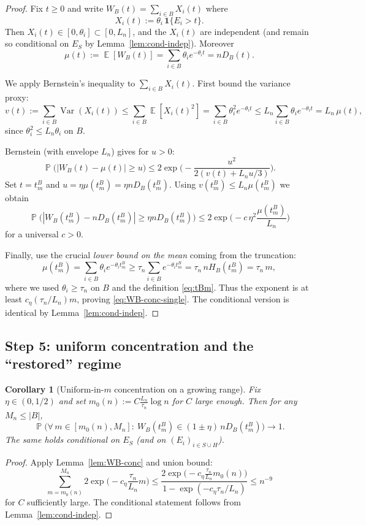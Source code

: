 \documentclass[11pt]{article}
\newtheorem{cor}{Corollary}
\DeclareMathOperator{\E}{\mathbb E}
\DeclareMathOperator{\Pp}{\mathbb P}
\DeclareMathOperator{\Var}{\mathrm{Var}}
\begin{document}
\begin{proof}
Fix $t\ge 0$ and write $W_B(t)=\sum_{i\in B}X_i(t)$ where
\[
X_i(t):=\theta_i\,\mathbf 1\{E_i>t\}.
\]
Then $X_i(t)\in[0,\theta_i]\subset[0,L_n]$, and the $X_i(t)$ are independent
(and remain so conditional on $E_S$ by Lemma~\ref{lem:cond-indep}).
Moreover
\[
\mu(t):=\E[W_B(t)] = \sum_{i\in B}\theta_i e^{-\theta_i t}=nD_B(t).
\]

We apply Bernstein's inequality to $\sum_{i\in B}X_i(t)$.
First bound the variance proxy:
\[
v(t):=\sum_{i\in B}\Var(X_i(t))
\le \sum_{i\in B}\E[X_i(t)^2]
=\sum_{i\in B}\theta_i^2 e^{-\theta_i t}
\le L_n\sum_{i\in B}\theta_i e^{-\theta_i t}
= L_n\,\mu(t),
\]
since $\theta_i^2\le L_n\theta_i$ on $B$.

Bernstein (with envelope $L_n$) gives for $u>0$:
\[
\Pp\big(|W_B(t)-\mu(t)|\ge u\big)
\le 2\exp\!\Big(-\frac{u^2}{2(v(t)+L_n u/3)}\Big).
\]
Set $t=t^B_m$ and $u=\eta\mu(t^B_m)=\eta nD_B(t^B_m)$. Using $v(t^B_m)\le L_n\mu(t^B_m)$ we obtain
\[
\Pp\Big(|W_B(t^B_m)-nD_B(t^B_m)|\ge \eta nD_B(t^B_m)\Big)
\le
2\exp\!\Big(-c\,\eta^2\frac{\mu(t^B_m)}{L_n}\Big)
\]
for a universal $c>0$.

Finally, use the crucial \emph{lower bound on the mean} coming from the truncation:
\[
\mu(t^B_m)=\sum_{i\in B}\theta_i e^{-\theta_i t^B_m}
\ge
\tau_n\sum_{i\in B} e^{-\theta_i t^B_m}
=\tau_n\,nH_B(t^B_m)
=\tau_n\,m,
\]
where we used $\theta_i\ge\tau_n$ on $B$ and the definition \eqref{eq:tBm}.
Thus the exponent is at least $c_\eta(\tau_n/L_n)m$, proving \eqref{eq:WB-conc-single}.
The conditional version is identical by Lemma~\ref{lem:cond-indep}.
\end{proof}

\subsection*{Step 5: uniform concentration and the ``restored'' regime}

\begin{cor}[Uniform-in-$m$ concentration on a growing range]\label{cor:WB-uniform}
Fix $\eta\in(0,1/2)$ and set $m_0(n):=C\frac{L_n}{\tau_n}\log n$ for $C$ large enough.
Then for any $M_n\le |B|$,
\[
\Pp\Big(\forall\, m\in[m_0(n),M_n]:\ W_B(t^B_m)\in(1\pm\eta)\,nD_B(t^B_m)\Big)\to 1.
\]
The same holds conditional on $E_S$ (and on $(E_i)_{i\in S\cup H}$).
\end{cor}

\begin{proof}
Apply Lemma~\ref{lem:WB-conc} and union bound:
\[
\sum_{m=m_0(n)}^{M_n}2\exp\!\Big(-c_\eta\frac{\tau_n}{L_n}m\Big)
\le
\frac{2\exp\!\big(-c_\eta\frac{\tau_n}{L_n}m_0(n)\big)}{1-\exp(-c_\eta\tau_n/L_n)}
\le n^{-9}
\]
for $C$ sufficiently large. The conditional statement follows from Lemma~\ref{lem:cond-indep}.
\end{proof}
\end{document}
